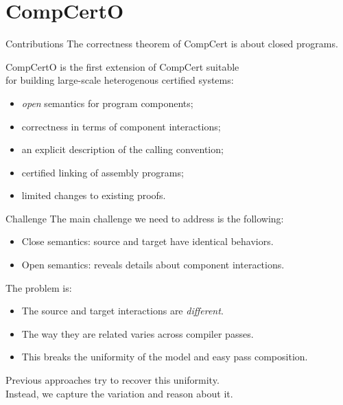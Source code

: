\documentclass[aspectratio=141]{beamer}
\begin{document}

\section{CompCertO} \label{sec:compcerto} %

\begin{frame}{Contributions} %
  The correctness theorem of CompCert
  is about closed programs.

  CompCertO is the first extension of CompCert
  suitable \\ for building large-scale heterogenous certified systems:
  \begin{itemize}[<+->]
    \item \emph{open} semantics for program components;
    \item correctness in terms of component interactions;
    \item an explicit description of the calling convention;
    \item certified linking of assembly programs;
    \item limited changes to existing proofs.
  \end{itemize}
\end{frame}

\begin{frame}{Challenge} %
  The main challenge we need to address is the following:
  \begin{itemize}
    \item Close semantics: source and target have identical behaviors.
    \item Open semantics: reveals details
      about component interactions.
  \end{itemize}
  \pause
  The problem is:
  \begin{itemize}
    \item The source and target interactions are \emph{different}.
    \item The way they are related varies across compiler passes.
    \item This breaks the uniformity of the model
      and easy pass composition.
  \end{itemize}
  \pause
  Previous approaches try to recover this uniformity. \\
  Instead, we capture the variation and reason about it.
\end{frame}
\end{document}
